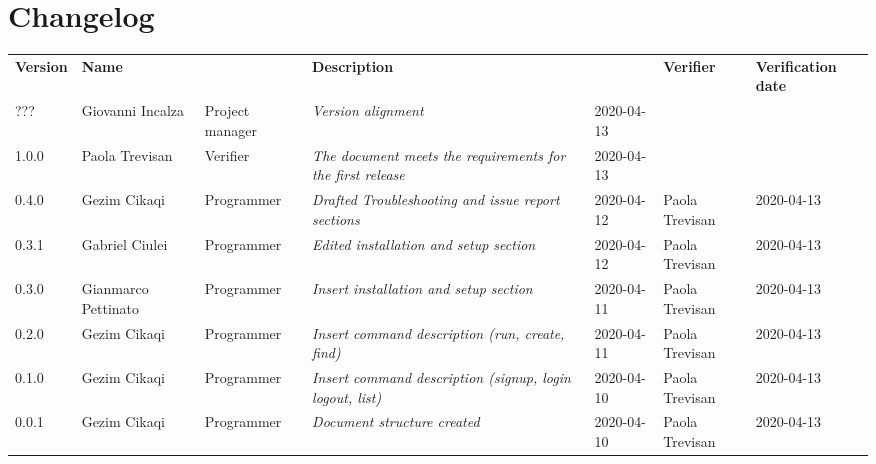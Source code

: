 \section*{Changelog}
\renewcommand{\arraystretch}{1.8}
  \setlength\LTleft{-1.7cm}
  \begin{longtable}{|p{1.7cm}|p{2cm}|p{2.5cm}|p{3cm}|p{1.7cm}|p{2cm}|p{2.3cm}|}
    \hline
    \rowcolor{header}
    \textbf{Version} & \textbf{Name} & \centering{\textbf{Role}} & \textbf{Description} &      \centering{\textbf{Date}} & \textbf{Verifier} & \textbf{Verification date} \\
    ??? & Giovanni Incalza & Project manager & \small{\textit{Version alignment}} & 2020-04-13 & & \\
    
    1.0.0 & Paola Trevisan & Verifier & \small{\textit{The document meets the requirements for the first release}} & 2020-04-13 & & \\
    
    0.4.0 & Gezim Cikaqi & Programmer & \small{\textit{Drafted Troubleshooting and issue report sections}} & 2020-04-12 & Paola Trevisan & 2020-04-13 \\
    
    0.3.1 & Gabriel Ciulei  & Programmer & \small{\textit{Edited installation and setup section}} & 2020-04-12 & Paola Trevisan & 2020-04-13 \\
    
    0.3.0 & Gianmarco Pettinato  & Programmer & \small{\textit{Insert installation and setup section}} & 2020-04-11 & Paola Trevisan & 2020-04-13 \\
    
    0.2.0 & Gezim Cikaqi  & Programmer & \small{\textit{Insert command description (run, create, find)}} & 2020-04-11 & Paola Trevisan & 2020-04-13 \\
    
	0.1.0 & Gezim Cikaqi  & Programmer & \small{\textit{Insert command description (signup, login logout, list)}} & 2020-04-10 & Paola Trevisan & 2020-04-13 \\
    
    0.0.1 & Gezim Cikaqi  & Programmer & \small{\textit{Document structure created}} & 2020-04-10 & Paola Trevisan & 2020-04-13\\

    \hline
  \end{longtable}
\setlength\LTleft{0cm}
\restoregeometry
